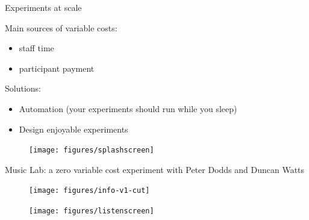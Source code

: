 \documentclass[aspectratio=169]{beamer}
\begin{document}
\begin{frame}

{\Large
\begin{center}
Experiments at scale
\end{center}
}
\end{frame}
\begin{frame}

\begin{center}
\end{center}

\end{frame}
\begin{frame}

Main sources of variable costs:
\begin{itemize}
\item staff time
\item participant payment
\end{itemize}

\vfill
\pause
Solutions:
\begin{itemize}
\item Automation (your experiments should run while you sleep)
\item Design enjoyable experiments
\end{itemize}

\end{frame}
\begin{frame}

\begin{figure}
  \centering
  \texttt{[image: figures/splashscreen]}
\end{figure}

Music Lab: a zero variable cost experiment with Peter Dodds and Duncan Watts

\end{frame}
\begin{frame}

\begin{figure}
  \centering
  \texttt{[image: figures/info-v1-cut]}
\end{figure}

\end{frame}
\begin{frame} 

\begin{figure}
  \centering
  \texttt{[image: figures/listenscreen]}
\end{figure}

\end{frame}
\end{document}
